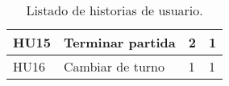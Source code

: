 \begin{table}[h]
\begin{center}
\begin{tabular}{|p{1cm}|p{7.5cm}|p{1.9cm}|p{1.6cm}|}
      \hline
      HU15
      & Terminar partida
      & 2
      & 1\\

      \hline
      HU16
      & Cambiar de turno
      & 1
      & 1\\

      \hline

    \end{tabular}

    \caption{Listado de historias de usuario.}
    \label{tabla-lista-historias-usuario}

  \end{center}
\end{table}

\newpage

\begin{comment}
En la Tabla \ref{tabla-product-backlog} podemos encontrar el Product Backlog.

\begin{table}[h]
  \begin{center}
    \begin{tabular}{|p{1cm}|p{7.5cm}|p{1.9cm}|p{1.6cm}|p{1.6cm}|}

      \hline
        \rowcolor{Gray} \textbf{ID}
        & \textbf{Título}
        & \textbf{Estimación}
        & \textbf{Iteración}
        & \textbf{Entrega}\\

      \hline
      HU1
      & Seleccionar personajes
      & 2
      & 3
      & 2\\

      \hline
      HU2
      & Comenzar juego
      & 3
      & 3
      & 2\\

      \hline
      HU3
      & Salir de la pantalla de instrucciones
      & 4
      & 3
      & 2\\

      \hline
      HU4
      & Escanear tablero
      & 5
      & 4
      & 2\\

      \hline
      HU5
      & Tirar los dados
      & 8
      & 5
      & 3\\

      \hline
      HU6
      & Seleccionar habitación a la que desplazarse
      & 2
      & 5
      & 3\\


\end{comment}
